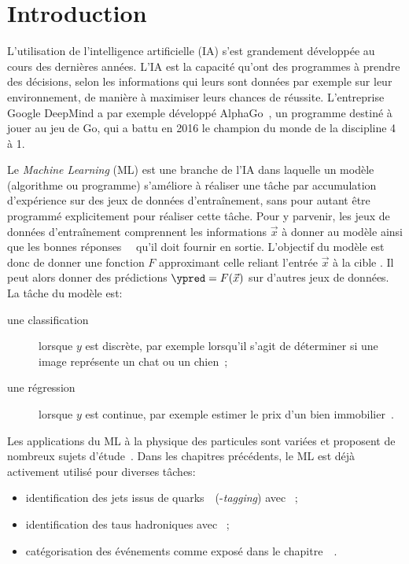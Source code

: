 \section{Introduction}\label{chapter-ML-section-intro}
L'utilisation de l'intelligence artificielle (IA) s'est grandement développée au cours des dernières années.
L'IA est la capacité qu'ont des programmes à prendre des décisions, selon les informations qui leurs sont données par exemple sur leur environnement, de manière à maximiser leurs chances de réussite.
L'entreprise Google DeepMind a par exemple développé AlphaGo~\cite{alphago},
un programme destiné à jouer au jeu de Go,
qui a battu en 2016 le champion du monde de la discipline 4 à 1.
\par
Le \emph{Machine Learning} (ML) est une branche de l'IA
dans laquelle un modèle (algorithme ou programme) s'améliore à réaliser une tâche par
accumulation d'expérience sur des jeux de données d'entraînement,
sans pour autant être programmé explicitement pour réaliser cette tâche.
Pour y parvenir,
les jeux de données d'entraînement comprennent les informations $\vec{x}$ à donner au modèle
ainsi que les \og bonnes réponses \fg\ \ytrue\ qu'il doit fournir en sortie.
L'objectif du modèle est donc de donner une fonction $F$ approximant celle reliant l'entrée $\vec{x}$ à la cible \ytrue.
Il peut alors donner des prédictions $\ypred=F(\vec{x})$ sur d'autres jeux de données.
La tâche du modèle est:
\begin{description}
\item[une classification] lorsque $y$ est discrète, par exemple lorsqu'il s'agit de déterminer si une image représente un chat ou un chien~\cite{datafrog_img_reco};
\item[une régression] lorsque $y$ est continue, par exemple estimer le prix d'un bien immobilier~\cite{house_prices_regression}.
\end{description}
\par
Les applications du ML à la physique des particules sont variées et proposent de nombreux sujets d'étude~\cite{Gael_thesis,scham_moritz_2020_21993,kopf_tanja_2019_21500,Baldi_2015}.
Dans les chapitres précédents, le ML est déjà activement utilisé pour diverses tâches:
\begin{itemize}
\item identification des jets issus de quarks~\quarkb\ (\quarkb-\emph{tagging}) avec \DeepCSV~\cite{jet_flavor_deep_nn,Sirunyan_heavy_flavor_jets_2018,DeepJet};
\item identification des taus hadroniques avec \DEEPTAU~\cite{CMS-DP-2019-033};
\item catégorisation des événements comme exposé dans le chapitre~~\cite{CMS-NOTE-2019-177,CMS-NOTE-2019-178}.
\end{itemize}
